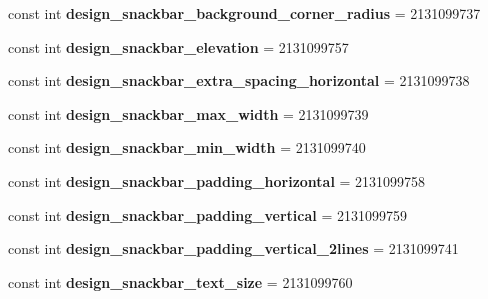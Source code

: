 \begin{DoxyCompactItemize}
const int {\bfseries design\+\_\+snackbar\+\_\+background\+\_\+corner\+\_\+radius} = 2131099737
\item 
\mbox{\label{classXaria_1_1Resource_1_1Dimension_a7a15dbe01018daddc20c7817dde773cb}} 
const int {\bfseries design\+\_\+snackbar\+\_\+elevation} = 2131099757
\item 
\mbox{\label{classXaria_1_1Resource_1_1Dimension_a2e76f83be047c6f498f1c65316abf601}} 
const int {\bfseries design\+\_\+snackbar\+\_\+extra\+\_\+spacing\+\_\+horizontal} = 2131099738
\item 
\mbox{\label{classXaria_1_1Resource_1_1Dimension_a788d7ab8e12b6f23a92e022c94e44872}} 
const int {\bfseries design\+\_\+snackbar\+\_\+max\+\_\+width} = 2131099739
\item 
\mbox{\label{classXaria_1_1Resource_1_1Dimension_a4c313a9c009026845bbf9629e4cf32fb}} 
const int {\bfseries design\+\_\+snackbar\+\_\+min\+\_\+width} = 2131099740
\item 
\mbox{\label{classXaria_1_1Resource_1_1Dimension_aa22d73655795cb08c827690c5c29c73e}} 
const int {\bfseries design\+\_\+snackbar\+\_\+padding\+\_\+horizontal} = 2131099758
\item 
\mbox{\label{classXaria_1_1Resource_1_1Dimension_a9936fdd637dd5baaf27b75f76254ced9}} 
const int {\bfseries design\+\_\+snackbar\+\_\+padding\+\_\+vertical} = 2131099759
\item 
\mbox{\label{classXaria_1_1Resource_1_1Dimension_a80bf5a670b760105ab915cd24e5617fa}} 
const int {\bfseries design\+\_\+snackbar\+\_\+padding\+\_\+vertical\+\_\+2lines} = 2131099741
\item 
\mbox{\label{classXaria_1_1Resource_1_1Dimension_a254e1490ed89e2c8267e693c2854537d}} 
const int {\bfseries design\+\_\+snackbar\+\_\+text\+\_\+size} = 2131099760
\item 
\mbox{\label{classXaria_1_1Resource_1_1Dimension_a602fe713caf0dd9e37858dd121f38356}} 

\end{DoxyCompactItemize}
